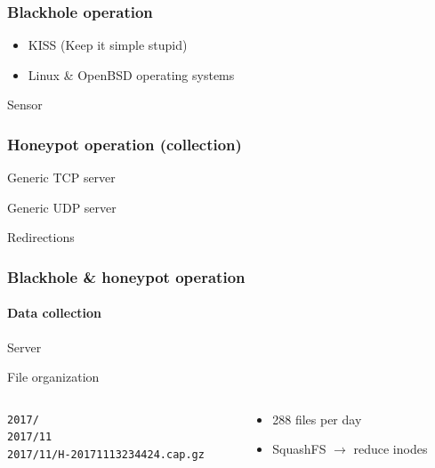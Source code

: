 \documentclass{beamer}
\begin{document}
\begin{frame}
\frametitle{Blackhole operation}
    \begin{definition}[Principle]
        \begin{itemize}
            \item KISS (Keep it simple stupid)
            \item Linux \& OpenBSD operating systems
        \end{itemize}
    \end{definition}

    \begin{block}{Sensor}
    
    \end{block}
\end{frame}

\begin{frame}
\frametitle{Honeypot operation (collection)}
\begin{block}{Generic TCP server}
    
\end{block}

\begin{block}{Generic UDP server}
    
\end{block}

\begin{block}{Redirections}
    
\end{block}
\end{frame}


\begin{frame}[fragile]
\frametitle{Blackhole \& honeypot operation}
\framesubtitle{Data collection}
\begin{block}{Server}

\end{block}

\begin{block}{File organization}
\begin{columns}
\begin{column}{0.6\textwidth}
\begin{verbatim}
2017/
2017/11
2017/11/H-20171113234424.cap.gz
\end{verbatim}
\end{column}
\begin{column}{0.4\textwidth}
\begin{itemize}
    \item 288 files per day
    \item SquashFS $\to$ reduce inodes
\end{itemize}
    \end{column}
    \end{columns}
\end{block}
\end{frame}
\end{document}
